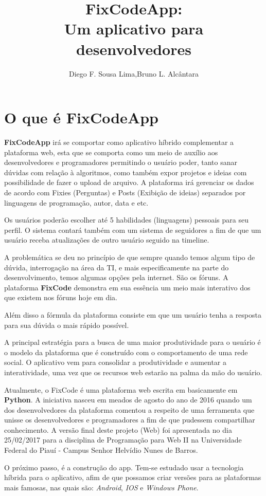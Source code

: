 \documentclass[12pt]{article}
\title{FixCodeApp:\\ Um aplicativo para desenvolvedores}
\author{Diego F. Sousa Lima\inst{1},Bruno L. Alcântara\inst{1} }
\begin{document}
 

\maketitle


\section{O que é FixCodeApp}

\textbf{FixCodeApp} irá se comportar como aplicativo híbrido complementar a plataforma web, esta que se comporta como um meio de auxílio aos desenvolvedores e programadores permitindo o usuário poder, tanto sanar dúvidas com relação à algoritmos, como também expor projetos e ideias com possibilidade de fazer o upload de arquivo. A plataforma irá gerenciar os dados de acordo com Fixies (Perguntas) e Posts (Exibição de ideias) separados por linguagens de programação,  autor, data e etc.

 Os usuários poderão escolher até 5 habilidades (linguagens) pessoais para seu perfil. O sistema contará também com um sistema de
seguidores a fim de que um usuário receba atualizações de outro usuário seguido na timeline.


A problemática se deu no princípio de que sempre quando temos algum tipo de dúvida, interrogação na área da TI, e mais especificamente na parte do desenvolvimento, temos algumas opções pela internet. São os fóruns. A plataforma \textbf{FixCode} demonstra em sua essência um meio mais interativo dos que existem nos fóruns hoje em dia.

 Além disso a fórmula da plataforma consiste em que um usuário tenha a resposta para sua dúvida o mais rápido possível.
 
 
A principal estratégia para a busca de uma maior produtividade para o usuário é o modelo da plataforma que é construído com o comportamento de uma rede social. O aplicativo vem para consolidar a produtividade e aumentar a interatividade, uma vez que os recursos web estarão na palma da mão do usuário.


Atualmente, o FixCode é uma plataforma web escrita em basicamente em \textbf{Python}. A iniciativa nasceu em meados de agosto do ano de 2016 quando um dos desenvolvedores da plataforma comentou a respeito de uma ferramenta que unisse os desenvolvedores e programadores a fim de que pudessem compartilhar conhecimento. 
A versão final deste projeto (Web) foi apresentada no dia 25/02/2017 para a disciplina de Programação para Web II na Universidade Federal do Piauí - Campus Senhor Helvídio Nunes de Barros.

 O próximo passo, é a construção do app. Tem-se estudado usar a tecnologia híbrida para o aplicativo, afim de que possamos criar versões para as plataformas mais famosas, nas quais são: \textit{Android}, \textit{IOS} e \textit{Windows Phone}. 
\end{document}
